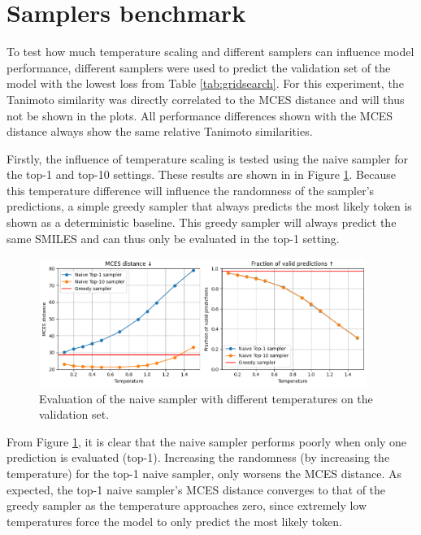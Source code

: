 \section{Samplers benchmark}

To test how much temperature scaling and different samplers can influence model performance, different samplers were used to predict the validation set of the model with the lowest loss from Table \ref{tab:gridsearch}.
For this experiment, the Tanimoto similarity was directly correlated to the MCES distance and will thus not be shown in the plots.
All performance differences shown with the MCES distance always show the same relative Tanimoto similarities.

Firstly, the influence of temperature scaling is tested using the naive sampler for the top-1 and top-10 settings.
These results are shown in in Figure \ref{fig:naive_and_greedy}.
Because this temperature difference will influence the randomness of the sampler's predictions, a simple greedy sampler that always predicts the most likely token is shown as a deterministic baseline.
This greedy sampler will always predict the same SMILES and can thus only be evaluated in the top-1 setting.

\begin{figure}[h]
    \centering
    \includegraphics[width=0.95\textwidth]{figures/results/samplers/naive_and_greedy.png}
    \caption{Evaluation of the naive sampler with different temperatures on the validation set.}
    \label{fig:naive_and_greedy}
\end{figure}

From Figure \ref{fig:naive_and_greedy}, it is clear that the naive sampler performs poorly when only one prediction is evaluated (top-1).
Increasing the randomness (by increasing the temperature) for the top-1 naive sampler, only worsens the MCES distance.
As expected, the top-1 naive sampler's MCES distance converges to that of the greedy sampler as the temperature approaches zero, since extremely low temperatures force the model to only predict the most likely token.

